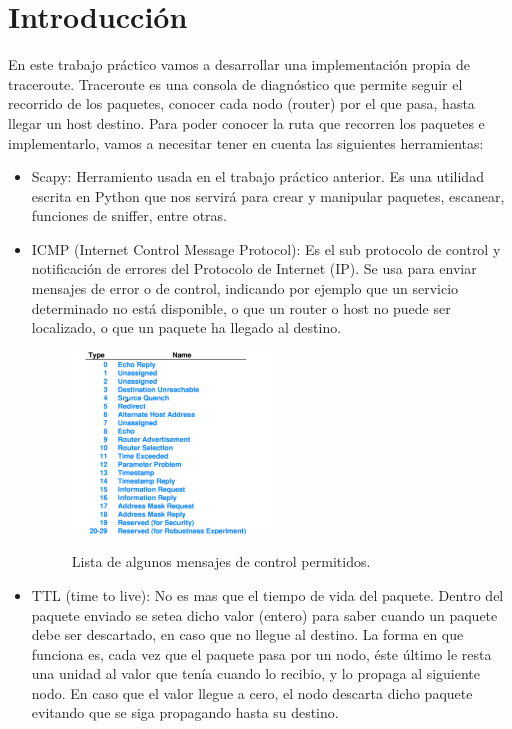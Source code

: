 \section{Introducci\'on}

En este trabajo pr\'actico vamos a desarrollar una implementaci\'on propia de traceroute. Traceroute es una consola de diagn\'ostico que permite seguir el recorrido de los paquetes, conocer cada nodo (router) por el que pasa, hasta llegar un host destino. Para poder conocer la ruta que recorren los paquetes e implementarlo, vamos a necesitar tener en cuenta las siguientes herramientas:

\begin{itemize}

\item Scapy: Herramiento usada en el trabajo pr\'actico anterior. Es una utilidad escrita en Python que nos servir\'a para crear y manipular paquetes, escanear, funciones de sniffer, entre otras.

\item ICMP (Internet Control Message Protocol): Es el sub protocolo de control y notificaci\'on de errores del Protocolo de Internet (IP). Se usa para enviar mensajes de error o de control, indicando por ejemplo que un servicio determinado no está disponible, o que un router o host no puede ser localizado, o que un paquete ha llegado al destino.
\begin{figure}[h]
	\begin{center}
    \includegraphics[width=0.5\textwidth]{ICMP_lista.png}
     \label{fig:ICMPlista} 
	\end{center}    
    \caption{Lista de algunos mensajes de control permitidos.}  
    
\end{figure}
\vspace{0.25cm}

\item TTL (time to live): No es mas que el tiempo de vida del paquete. Dentro del paquete enviado se setea dicho valor (entero) para saber cuando un paquete debe ser descartado, en caso que no llegue al destino. La forma en que funciona es, cada vez que el paquete pasa por un nodo, \'este \'ultimo le resta una unidad al valor que tenía cuando lo recibio, y lo propaga al siguiente nodo. En caso que el valor llegue a cero, el nodo descarta dicho paquete evitando que se siga propagando hasta su destino.


\end{itemize}
